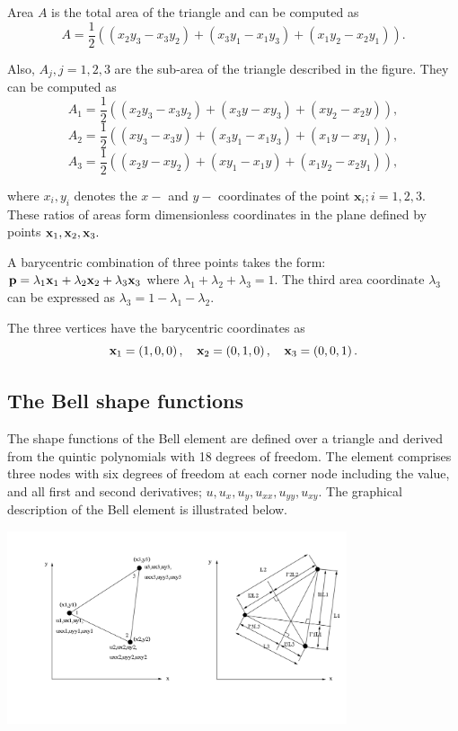 Area $ A $ is the total area of the triangle and can be computed as \[ A = \frac{1}{2}\left(\left(x_2y_3-x_3y_2\right) + \left(x_3y_1-x_1y_3\right) + \left(x_1y_2-x_2y_1\right)\right).\]

Also, $ A_j, j=1,2,3 $ are the sub-\/area of the triangle described in the figure. They can be computed as \[ A_1 = \frac{1}{2}\left(\left(x_2y_3-x_3y_2\right) + \left(x_3y-xy_3\right) + \left(xy_2-x_2y\right)\right),\] \[ A_2 = \frac{1}{2}\left(\left(xy_3-x_3y\right) + \left(x_3y_1-x_1y_3\right) + \left(x_1y-xy_1\right)\right),\] \[ A_3 = \frac{1}{2}\left(\left(x_2y-xy_2\right) + \left(xy_1-x_1y\right) + \left(x_1y_2-x_2y_1\right)\right),\]

where $ x_i,y_i $ denotes the $ x- $ and $ y- $ coordinates of the point $ \mathbf{x}_i;i =1,2,3. $ These ratios of areas form dimensionless coordinates in the plane defined by points $ {\bf x}_{1}, {\bf x}_{2}, {\bf x}_{3}. $

A barycentric combination of three points takes the form\+: $ {\bf p} = \lambda_1{\bf x}_{1} + \lambda_2{\bf x}_{2} + \lambda_3{\bf x}_{3}$ where $ \lambda_1+\lambda_2+\lambda_3 = 1.$ The third area coordinate $ \lambda_3 $ can be expressed as $ \lambda_3 = 1-\lambda_1-\lambda_2. $

The three vertices have the barycentric coordinates as \[ {\bf x}_{1} = \left(1,0,0\right), \ \ \ {\bf x}_{2} = \left(0,1,0\right), \ \ \ {\bf x}_{3} = \left(0,0,1\right). \]



\hypertarget{index_bell_shape}{}\subsection{The Bell shape functions}\label{index_bell_shape}
The shape functions of the Bell element are defined over a triangle and derived from the quintic polynomials with 18 degrees of freedom. The element comprises three nodes with six degrees of freedom at each corner node including the value, and all first and second derivatives; $ u, u_{x}, u_{y}, u_{xx}, u_{yy}, u_{xy}. $ The graphical description of the Bell element is illustrated below.

 
\begin{DoxyImage}
\includegraphics[width=0.75\textwidth]{bell_element}
\end{DoxyImage}


